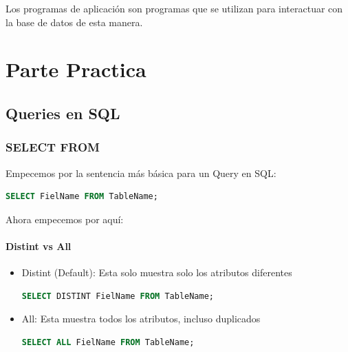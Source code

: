 \documentclass[12pt, fleqn]{report}                             %
\begin{document}
            Los programas de aplicación son programas que se utilizan para interactuar con la base de datos de esta manera.








\part{Parte Practica}
\clearpage


    \chapter{Queries en SQL}
    \clearpage

        \section{SELECT FROM}

            Empecemos por la sentencia más básica para un Query en SQL:

            \begin{lstlisting}[language=SQL, gobble=16]
                SELECT FielName FROM TableName;
            \end{lstlisting}

            Ahora empecemos por aquí:
            \subsection{Distint vs All}
            \begin{itemize}
                \item Distint (Default):
                    Esta solo muestra solo los atributos diferentes

                    \begin{lstlisting}[language=SQL, gobble=24]
                        SELECT DISTINT FielName FROM TableName;
                    \end{lstlisting}
                \item All:
                    Esta muestra todos los atributos, incluso duplicados
                    \begin{lstlisting}[language=SQL, gobble=24]
                        SELECT ALL FielName FROM TableName;
                    \end{lstlisting}
            \end{itemize}
\end{document}
